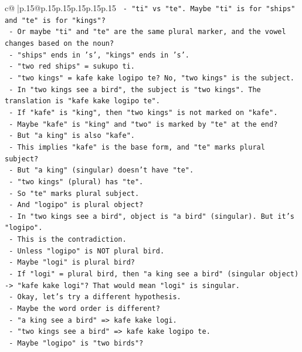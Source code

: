 \documentclass{article}
\begin{document}
{\begin{supertabular}{c@{$\;$}|p{.15\linewidth}@{}p{.15\linewidth}p{.15\linewidth}p{.15\linewidth}p{.15\linewidth}p{.15\linewidth}}
{{{\texttt{  {-} "ti" vs "te". Maybe "ti" is for "ships" and "te" is for "kings"?} \\
\texttt{  {-} Or maybe "ti" and "te" are the same plural marker, and the vowel changes based on the noun?} \\
\texttt{  {-} "ships" ends in 's', "kings" ends in 's'.} \\
\texttt{  {-} "two red ships" = sukupo ti.} \\
\texttt{  {-} "two kings" = kafe kake logipo te? No, "two kings" is the subject.} \\
\texttt{  {-} In "two kings see a bird", the subject is "two kings". The translation is "kafe kake logipo te".} \\
\texttt{  {-} If "kafe" is "king", then "two kings" is not marked on "kafe".} \\
\texttt{  {-} Maybe "kafe" is "king" and "two" is marked by "te" at the end?} \\
\texttt{  {-} But "a king" is also "kafe".} \\
\texttt{  {-} This implies "kafe" is the base form, and "te" marks plural subject?} \\
\texttt{  {-} But "a king" (singular) doesn't have "te".} \\
\texttt{  {-} "two kings" (plural) has "te".} \\
\texttt{  {-} So "te" marks plural subject.} \\
\texttt{  {-} And "logipo" is plural object?} \\
\texttt{  {-} In "two kings see a bird", object is "a bird" (singular). But it's "logipo".} \\
\texttt{  {-} This is the contradiction.} \\
\texttt{  {-} Unless "logipo" is NOT plural bird.} \\
\texttt{  {-} Maybe "logi" is plural bird?} \\
\texttt{  {-} If "logi" = plural bird, then "a king see a bird" (singular object) {-}> "kafe kake logi"? That would mean "logi" is singular.} \\
\texttt{  {-} Okay, let's try a different hypothesis.} \\
\texttt{  {-} Maybe the word order is different?} \\
\texttt{  {-} "a king see a bird" => kafe kake logi.} \\
\texttt{  {-} "two kings see a bird" => kafe kake logipo te.} \\
\texttt{  {-} Maybe "logipo" is "two birds"?} \\
}}}
\end{supertabular}}
\end{document}
